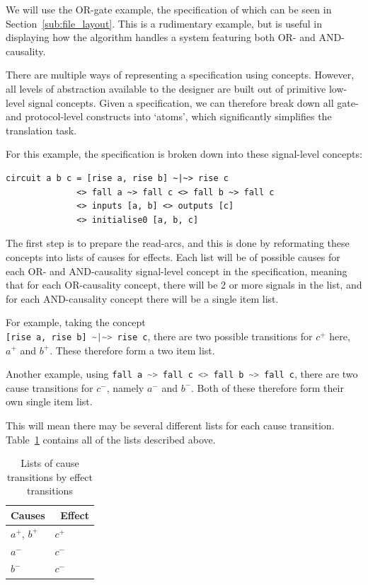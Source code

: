 \documentclass[british,conference,compsoc]{IEEEtran}
\begin{document}
We will use the OR-gate example, the specification of which can be seen in 
Section~\ref{sub:file_layout}. This is a rudimentary example, but is useful in 
displaying how the algorithm handles a system featuring both OR- and 
AND-causality.

There are multiple ways of representing a specification using concepts. However,
all levels of abstraction available to the designer are built out of primitive 
low-level signal concepts. Given a specification, we can therefore break down 
all gate- and protocol-level constructs into `atoms', which significantly 
simplifies the translation task.

For this example, the specification is broken down into these signal-level 
concepts:

\begin{lstlisting}
circuit a b c = [rise a, rise b] ~|~> rise c 
              <> fall a ~> fall c <> fall b ~> fall c
              <> inputs [a, b] <> outputs [c] 
              <> initialise0 [a, b, c]
\end{lstlisting}

\noindent The first step is to prepare the read-arcs, and this is done by
reformating these concepts into lists of causes for effects.
Each list will be of possible causes for each OR- and AND-causality signal-level
concept in the specification, meaning that for each OR-causality concept, 
there will be 2 or more signals in the list, and for each AND-causality 
concept there will be a single item list.

For example, taking the concept\\
\lstinline[language=haskell]{[rise a, rise b] ~|~> rise c}, there are
two possible transitions for $c^{+}$ here, $a^{+}$ and $b^{+}$. These therefore 
form a two item list. 

Another example, using 
\lstinline[language=haskell]{fall a ~> fall c <> fall b ~> fall c}, there are 
two cause transitions for $c^{-}$, namely $a^{-}$ and $b^{-}$. Both of these 
therefore form their own single item list. 

This will mean there may be several different lists for each cause transition. 
Table~\ref{tab:list-of-concepts} contains all of the lists described above.

\vspace{-1mm}

\begin{table}[h]
\caption{Lists of cause transitions by effect transitions
		\label{tab:list-of-concepts}}
  \centering
\begin{tabular}[htb]{| m{2.6cm} | m{2.0cm} |}
  \hline
Causes & \, Effect \\ \hline \hline
$a^{+}$, $b^{+}$ & $c^{+}$ \\ \hline
$a^{-}$ & $c^{-}$ \\ \hline
$b^{-}$ & $c^{-}$ \\ \hline
  \end{tabular}
  \vspace{-1mm}
\end{table}
\end{document}
